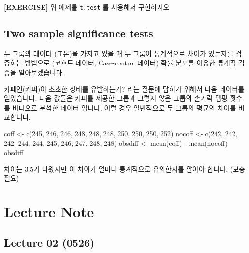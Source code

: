 \documentclass[
]{book}
\newenvironment{Shaded}{\begin{snugshade}}{\end{snugshade}}
\newcommand{\DecValTok}[1]{\textcolor[rgb]{0.00,0.00,0.81}{#1}}
\newcommand{\FunctionTok}[1]{\textcolor[rgb]{0.00,0.00,0.00}{#1}}
\newcommand{\NormalTok}[1]{#1}
\newcommand{\OtherTok}[1]{\textcolor[rgb]{0.56,0.35,0.01}{#1}}
\newcommand{\SpecialCharTok}[1]{\textcolor[rgb]{0.00,0.00,0.00}{#1}}
\begin{document}
\textbf{{[}EXERCISE{]}} 위 예제를 \texttt{t.test} 를 사용해서 구현하시오

\hypertarget{two-sample-significance-tests}{%
\section{Two sample significance tests}\label{two-sample-significance-tests}}

두 그룹의 데이터 (표본)을 가지고 있을 때 두 그룹이 통계적으로 차이가 있는지를 검증하는 방법으로 (코흐트 데이터, Case-control 데이터) 확률 분포를 이용한 통계적 검증을 알아보겠습니다.

카페인(커피)이 초초한 상태를 유발하는가? 라는 질문에 답하기 위해서 다음 데이터를 얻었습니다. 다음 값들은 커피를 제공한 그룹과 그렇지 않은 그룹의 손가락 탭핑 횟수를 비디오로 분석한 데이터 입니다. 이럴 경우 일반적으로 두 그룹의 평균의 차이를 비교합니다.

\begin{Shaded}
\begin{Highlighting}[]
\NormalTok{coff }\OtherTok{\textless{}{-}} \FunctionTok{c}\NormalTok{(}\DecValTok{245}\NormalTok{, }\DecValTok{246}\NormalTok{, }\DecValTok{246}\NormalTok{, }\DecValTok{248}\NormalTok{, }\DecValTok{248}\NormalTok{, }\DecValTok{248}\NormalTok{, }\DecValTok{250}\NormalTok{, }\DecValTok{250}\NormalTok{, }\DecValTok{250}\NormalTok{, }\DecValTok{252}\NormalTok{)}
\NormalTok{nocoff }\OtherTok{\textless{}{-}} \FunctionTok{c}\NormalTok{(}\DecValTok{242}\NormalTok{, }\DecValTok{242}\NormalTok{, }\DecValTok{242}\NormalTok{, }\DecValTok{244}\NormalTok{, }\DecValTok{244}\NormalTok{, }\DecValTok{245}\NormalTok{, }\DecValTok{246}\NormalTok{, }\DecValTok{247}\NormalTok{, }\DecValTok{248}\NormalTok{, }\DecValTok{248}\NormalTok{)}
\NormalTok{obsdiff }\OtherTok{\textless{}{-}} \FunctionTok{mean}\NormalTok{(coff) }\SpecialCharTok{{-}} \FunctionTok{mean}\NormalTok{(nocoff)}
\NormalTok{obsdiff}
\end{Highlighting}
\end{Shaded}

차이는 3.5가 나왔지만 이 차이가 얼마나 통계적으로 유의한지를 알아야 합니다. (보충 필요)

\hypertarget{lecture-note}{%
\chapter{Lecture Note}\label{lecture-note}}

\hypertarget{lecture-02-0526}{%
\section{Lecture 02 (0526)}\label{lecture-02-0526}}
\end{document}
